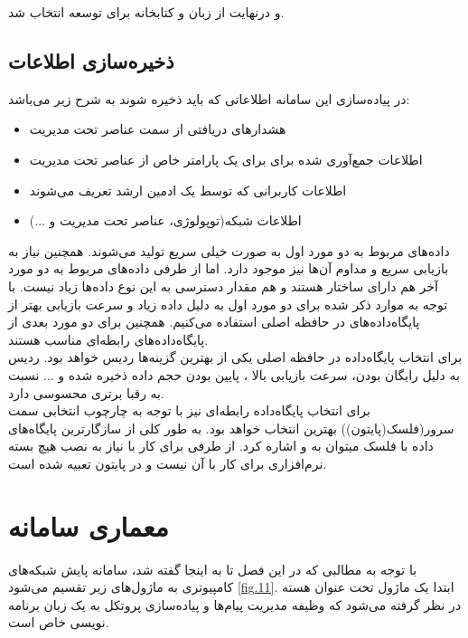 و درنهایت از زبان  و کتابخانه  برای توسعه انتخاب شد.


\subsection{ذخیره‌سازی اطلاعات}

در پیاده‌سازی این سامانه اطلاعاتی که باید ذخیره شوند به شرح زیر می‌باشد:
\begin{itemize}
    \item هشدارهای دریافتی از سمت عناصر تحت مدیریت
    \item اطلاعات جمع‌آوری شده برای برای یک پارامتر خاص از عناصر تحت مدیریت
    \item اطلاعات کاربرانی که توسط یک ادمین ارشد تعریف می‌شوند
    \item اطلاعات شبکه‌(توپولوژی، عناصر تحت مدیریت و ...)

\end{itemize}

داده‌های مربوط به دو مورد اول به صورت خیلی سریع تولید می‌شوند. همچنین نیاز به بازیابی سریع و مداوم آن‌ها نیز موجود دارد. اما از طرفی داده‌های مربوط به دو مورد آخر هم دارای ساختار هستند و هم مقدار دسترسی به این نوع داده‌ها زیاد نیست. با توجه به موارد ذکر شده برای دو مورد اول به دلیل داده زیاد و سرعت بازیابی بهتر از پایگاه‌داده‌های در حافظه اصلی استفاده می‌کنیم. همچنین برای دو مورد بعدی از پایگاه‌داده‌های رابطه‌ای مناسب هستند.
\\
برای انتخاب پایگاه‌داده‌ در حافظه اصلی یکی از بهترین گزینه‌ها ردیس خواهد بود. ردیس به دلیل رایگان بودن، سرعت بازیابی بالا ، پایین بودن حجم داده ذخیره شده و ... نسبت به رقبا برتری محسوسی دارد.
\\
برای انتخاب پایگاه‌داده رابطه‌ای نیز با توجه به چارچوب انتخابی سمت سرور(فلسک(پایتون))  بهترین انتخاب خواهد بود. به طور کلی از سازگارترین پایگاه‌های داده با فلسک میتوان به  و  اشاره کرد. از طرفی برای کار با  نیاز به نصب هیچ بسته نرم‌افزاری برای کار با آن نیست و در پایتون تعبیه شده است.



\newpage

\section{معماری سامانه}




با توجه به مطالبی که در این فصل تا به اینجا گفته شد، سامانه پایش شبکه‌های کامپیوتری به ماژول‌های زیر تقسیم می‌شود \cref{fig.11}. ابتدا یک ماژول تحت عنوان هسته  در نظر گرفته می‌شود که وظیفه مدیریت پیام‌ها و پیاده‌سازی پروتکل به یک زبان برنامه نویسی خاص است.




